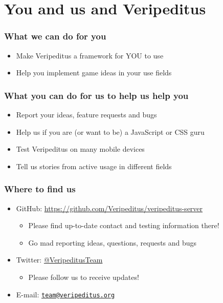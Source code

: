 \documentclass[aspectratio=43]{beamer}
\begin{document}
 \section{You and us and Veripeditus}

 \begin{frame}
  \frametitle{What we can do for you}

  \begin{itemize}
   \item{Make Veripeditus a framework for YOU to use}
   \item{Help you implement game ideas in your use fields}
  \end{itemize}
 \end{frame}

 \begin{frame}
  \frametitle{What you can do for us to help us help you}

  \begin{itemize}
   \item{Report your ideas, feature requests and bugs}
   \item{Help us if you are (or want to be) a JavaScript or CSS guru}
   \item{Test Veripeditus on many mobile devices}
   \item{Tell us stories from active usage in different fields}
  \end{itemize}
 \end{frame}

 \begin{frame}
  \frametitle{Where to find us}

  \begin{itemize}
   \item{GitHub: \url{https://github.com/Veripeditus/veripeditus-server}
    \begin{itemize}
     \item{Please find up-to-date contact and testing information there!}
     \item{Go mad reporting ideas, questions, requests and bugs}
    \end{itemize}
   }
   \item{Twitter: \href{https://www.twitter.com/VeripeditusTeam}{@VeripeditusTeam}
    \begin{itemize}
     \item{Please follow us to receive updates!}
    \end{itemize}
   }
   \item{E-mail: \href{mailto:team@veripeditus.org}{\nolinkurl{team@veripeditus.org}} }
  \end{itemize}
 \end{frame}
\end{document}
